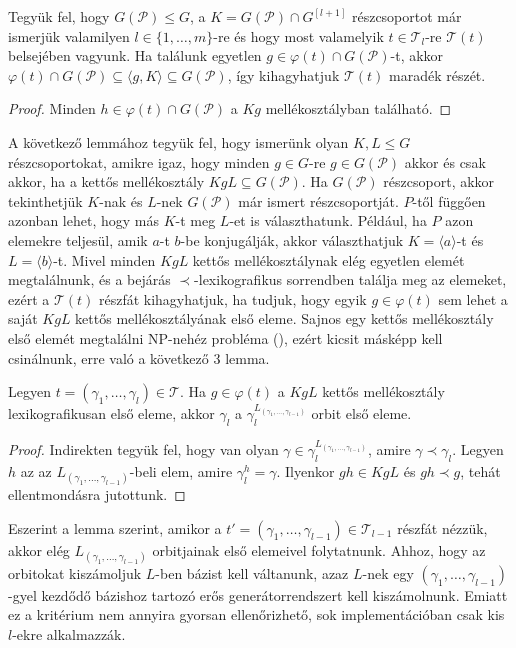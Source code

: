 \begin{lemma}
\label{thm:permbtcrit1}
Tegyük fel, hogy $G(\mathcal{P}) \le G$, a $K = G(\mathcal{P}) \cap G^{[l+1]}$ részcsoportot már ismerjük valamilyen $l \in \{1,\dots,m\}$-re és hogy most valamelyik $t \in \mathcal{T}_l$-re $\mathcal{T}(t)$ belsejében vagyunk.
Ha találunk egyetlen $g \in \varphi(t) \cap G(\mathcal{P})$-t, akkor $\varphi(t) \cap G(\mathcal{P}) \subseteq \langle g, K \rangle \subseteq G(\mathcal{P})$, így kihagyhatjuk $\mathcal{T}(t)$ maradék részét.
\end{lemma}
\begin{proof}
Minden $h \in \varphi(t) \cap G(\mathcal{P})$ a $Kg$ mellékosztályban található.
\end{proof}
A következő lemmához tegyük fel, hogy ismerünk olyan $K, L \le G$ részcsoportokat, amikre igaz, hogy minden $g \in G$-re $g \in G(\mathcal{P})$ akkor és csak akkor, ha a kettős mellékosztály $KgL \subseteq G(\mathcal{P})$.
Ha $G(\mathcal{P})$ részcsoport, akkor tekinthetjük $K$-nak és $L$-nek $G(\mathcal{P})$ már ismert részcsoportját.
$P$-től függően azonban lehet, hogy más $K$-t meg $L$-et is választhatunk.
Például, ha $P$ azon elemekre teljesül, amik $a$-t $b$-be konjugálják, akkor választhatjuk $K=\langle a \rangle$-t és $L=\langle b \rangle$-t.
Mivel minden $KgL$ kettős mellékosztálynak elég egyetlen elemét megtalálnunk, és a bejárás $\prec$-lexikografikus sorrendben találja meg az elemeket, ezért a $\mathcal{T}(t)$ részfát kihagyhatjuk, ha tudjuk, hogy
egyik $g \in \varphi(t)$ sem lehet a saját $KgL$ kettős mellékosztályának első eleme.
Sajnos egy kettős mellékosztály első elemét megtalálni NP-nehéz probléma (\cite{Luk93}), ezért kicsit másképp kell csinálnunk, erre való a következő 3 lemma.

\begin{lemma}
\label{thm:permbtcrit2}
Legyen $t = (\gamma_1, \dots, \gamma_l) \in \mathcal{T}$.
Ha $g \in \varphi(t)$ a $KgL$ kettős mellékosztály lexikografikusan első eleme, akkor $\gamma_l$ a $\gamma_l^{L_{(\gamma_1,\dots,\gamma_{l-1})}}$ orbit első eleme.
\end{lemma}
\begin{proof}
Indirekten tegyük fel, hogy van olyan $\gamma \in \gamma_l^{L_{(\gamma_1,\dots,\gamma_{l-1})}}$, amire $\gamma \prec \gamma_l$.
Legyen $h$ az az $L_{(\gamma_1,\dots,\gamma_{l-1})}$-beli elem, amire $\gamma_l^h = \gamma$.
Ilyenkor $gh \in KgL$ és $gh \prec g$, tehát ellentmondásra jutottunk.
\end{proof}
Eszerint a lemma szerint, amikor a $t' = (\gamma_1, \dots, \gamma_{l-1}) \in \mathcal{T}_{l-1}$ részfát nézzük, akkor elég $L_{(\gamma_1,\dots,\gamma_{l-1})}$ orbitjainak első elemeivel folytatnunk.
Ahhoz, hogy az orbitokat kiszámoljuk $L$-ben bázist kell váltanunk, azaz $L$-nek egy $(\gamma_1,\dots,\gamma_{l-1})$-gyel kezdődő bázishoz tartozó erős generátorrendszert kell kiszámolnunk.
Emiatt ez a kritérium nem annyira gyorsan ellenőrizhető, sok implementációban csak kis $l$-ekre alkalmazzák.

